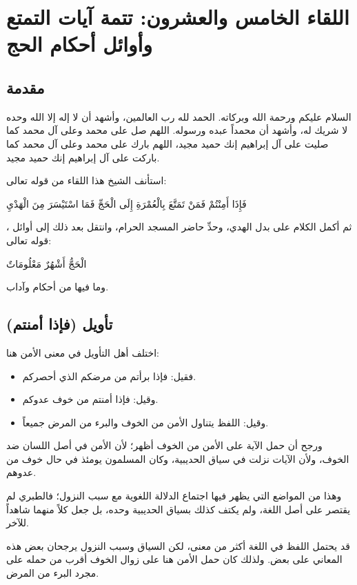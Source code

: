 \chapter{اللقاء الخامس والعشرون: تتمة آيات التمتع وأوائل أحكام الحج}

\section{مقدمة}
السلام عليكم ورحمة الله وبركاته. الحمد لله رب العالمين، وأشهد أن لا إله إلا الله وحده لا شريك له، وأشهد أن محمداً عبده ورسوله. اللهم صل على محمد وعلى آل محمد كما صليت على آل إبراهيم إنك حميد مجيد، اللهم بارك على محمد وعلى آل محمد كما باركت على آل إبراهيم إنك حميد مجيد.

استأنف الشيخ هذا اللقاء من قوله تعالى: \begin{ayah}فَإِذَا أَمِنْتُمْ فَمَنْ تَمَتَّعَ بِالْعُمْرَةِ إِلَى الْحَجِّ فَمَا اسْتَيْسَرَ مِنَ الْهَدْيِ\end{ayah}، ثم أكمل الكلام على بدل الهدي، وحدِّ حاضر المسجد الحرام، وانتقل بعد ذلك إلى أوائل قوله تعالى: \begin{ayah}الْحَجُّ أَشْهُرٌ مَعْلُومَاتٌ\end{ayah} وما فيها من أحكام وآداب.

\separator

\section{تأويل (فإذا أمنتم)}
 اختلف أهل التأويل في معنى الأمن هنا:
\begin{itemize}
    \item فقيل: فإذا برأتم من مرضكم الذي أحصركم.
    \item وقيل: فإذا أمنتم من خوف عدوكم.
    \item وقيل: اللفظ يتناول الأمن من الخوف والبرء من المرض جميعاً.
\end{itemize}

ورجح  أن حمل الآية على الأمن من الخوف أظهر؛ لأن الأمن في أصل اللسان ضد الخوف، ولأن الآيات نزلت في سياق الحديبية، وكان المسلمون يومئذ في حال خوف من عدوهم.

وهذا من المواضع التي يظهر فيها اجتماع الدلالة اللغوية مع سبب النزول؛ فالطبري لم يقتصر على أصل اللغة، ولم يكتف كذلك بسياق الحديبية وحده، بل جعل كلاً منهما شاهداً للآخر.

\begin{fawaid}
قد يحتمل اللفظ في اللغة أكثر من معنى، لكن السياق وسبب النزول يرجحان بعض هذه المعاني على بعض. ولذلك كان حمل الأمن هنا على زوال الخوف أقرب من حمله على مجرد البرء من المرض.
\end{fawaid}

